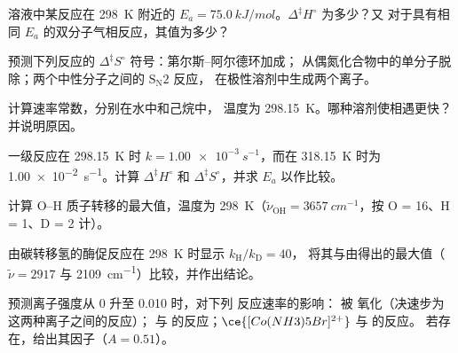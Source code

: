 \begin{exercise}[$\star$]\label{exo:b3:rate-theories:2}
溶液中某反应在 \qty{298}{K} 附近的 $E_a = \qty{75.0}{kJ/mol}$。$\Delta^{\ddagger}H^\circ$ 为多少？又
对于具有相同 $E_a$ 的双分子气相反应，其值为多少？
\end{exercise}

\begin{exercise}[$\star$]\label{exo:b3:rate-theories:3}
预测下列反应的 $\Delta^{\ddagger}S^\circ$ 符号：第尔斯–阿尔德环加成；
 从偶氮化合物中的单分子脱除；两个中性分子之间的 $\mathrm{S_N2}$ 反应，
在极性溶剂中生成两个离子。
\end{exercise}

\begin{exercise}[$\star$]\label{exo:b3:rate-theories:4}
计算速率常数，分别在水中和己烷中，
温度为 \qty{298.15}{K}。哪种溶剂使相遇更快？并说明原因。
\end{exercise}

\begin{exercise}[$\star\star$]\label{exo:b3:rate-theories:5}
一级反应在 \qty{298.15}{K} 时 $k = \qty{1.00e-3}{s^{-1}}$，而在
\qty{318.15}{K} 时为 \qty{1.00e-2}{s^{-1}}。计算 $\Delta^{\ddagger}H^\circ$ 和 $\Delta^{\ddagger}S^\circ$，并求 $E_a$ 以作比较。
\end{exercise}

\begin{exercise}[$\star\star$]\label{exo:b3:rate-theories:6}
计算 O--H 质子转移的最大值，温度为
\qty{298}{K}（$\tilde\nu_{\mathrm{OH}} = \qty{3657}{cm^{-1}}$，按 O = 16、H = 1、D = 2 计）。
\end{exercise}

\begin{exercise}[$\star\star$]\label{exo:b3:rate-theories:7}
由碳转移氢的酶促反应在 \qty{298}{K} 时显示 $k_{\mathrm H}/k_{\mathrm D} = 40$，
将其与由得出的最大值（$\tilde\nu = 2917$ 与 \qty{2109}{cm^{-1}}）比较，并作出结论。
\end{exercise}

\begin{exercise}[$\star\star$]\label{exo:b3:rate-theories:8}
预测离子强度从 0 升至 0.010 时，对下列
反应速率的影响： 被  氧化（决速步为这两种离子之间的反应）；
 与  的反应；$\ce{[Co(NH3)5Br]^{2+}}$ 与  的反应。
若存在，给出其因子（$A = 0.51$）。
\end{exercise}

